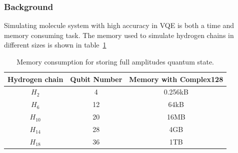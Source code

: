\subsubsection{Background}
Simulating molecule system with high accuracy in VQE is both a time and memory consuming task. The memory used to simulate hydrogen chains in different sizes is shown in table~\ref{tab:memory_h_chain}

\begin{table}[ht]
    \begin{tabular}{ccc}
        \toprule
        Hydrogen chain & Qubit Number & Memory with Complex128 \\
        \midrule
        $H_2$          & 4            & 0.256kB                \\
        $H_6$          & 12           & 64kB                   \\
        $H_{10}$       & 20           & 16MB                   \\
        $H_{14}$       & 28           & 4GB                    \\
        $H_{18}$       & 36           & 1TB                    \\
        \bottomrule
    \end{tabular}
    \caption{Memory consumption for storing full amplitudes quantum state.}
    \label{tab:memory_h_chain}
\end{table}

